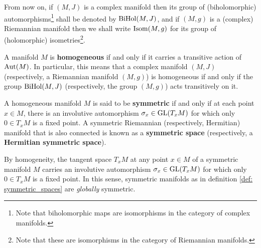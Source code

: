             \begin{convention}
                From now on, if $(M, J)$ is a complex manifold then its group of (biholomorphic) automorphisms\footnote{Note that biholomorphic maps are isomorphisms in the category of complex manifolds.} shall be denoted by $\mathrm{Bi}\mathrm{Hol}(M, J)$, and if $(M, g)$ is a (complex) Riemannian manifold then we shall write $\mathrm{Isom}(M, g)$ for its group of (holomorphic) isometries\footnote{Note that these are isomorphisms in the category of Riemannian manifolds.}.
            \end{convention}
            \begin{definition} \label{def: homogeneous_manifolds}
                A manifold $M$ is \textbf{homogeneous} if and only if it carries a transitive action of $\mathrm{Aut}(M)$. In particular, this means that a complex manifold $(M, J)$ (respectively, a Riemannian manifold $(M, g)$) is homogeneous if and only if the group $\mathrm{Bi}\mathrm{Hol}(M, J)$ (respectively, the group $(M, g)$) acts transitively on it.
            \end{definition}
            \begin{definition} \label{def: symmetric_spaces}
                A homogeneous manifold $M$ is said to be \textbf{symmetric} if and only if at each point $x \in M$, there is an involutive automorphism $\sigma_x \in \operatorname{GL}(T_xM)$ for which only $0 \in T_xM$ is a fixed point. A symmetric Riemannian (respectively, Hermitian) manifold that is also connected is known as a \textbf{symmetric space} (respectively, a \textbf{Hermitian symmetric space}).
            \end{definition}
            \begin{remark}
                By homogeneity, the tangent space $T_xM$ at any point $x \in M$ of a symmetric manifold $M$ carries an involutive automorphism $\sigma_x \in \operatorname{GL}(T_xM)$ for which only $0 \in T_xM$ is a fixed point. In this sense, symmetric manifolds as in definition \ref{def: symmetric_spaces} are \textit{globally} symmetric.
            \end{remark}
